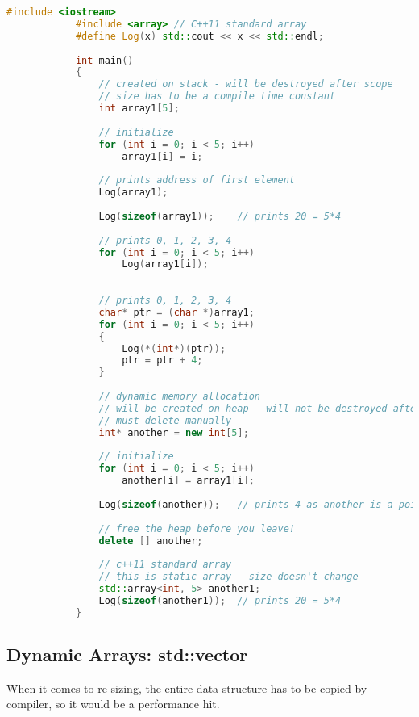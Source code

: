 \documentclass{article}
\begin{document}
        \begin{lstlisting}[language=C++, caption=Raw arrays - Stack vs Heap example]
            #include <iostream>
            #include <array> // C++11 standard array
            #define Log(x) std::cout << x << std::endl;
            
            int main()
            {
            	// created on stack - will be destroyed after scope
            	// size has to be a compile time constant
            	int array1[5];
            
            	// initialize
            	for (int i = 0; i < 5; i++)
            		array1[i] = i;
            
            	// prints address of first element
            	Log(array1);	
            
            	Log(sizeof(array1));	// prints 20 = 5*4
            
            	// prints 0, 1, 2, 3, 4
            	for (int i = 0; i < 5; i++)
            		Log(array1[i]); 
            
            	
            	// prints 0, 1, 2, 3, 4
            	char* ptr = (char *)array1;
            	for (int i = 0; i < 5; i++)
            	{
            		Log(*(int*)(ptr));
            		ptr = ptr + 4;
            	}
            
            	// dynamic memory allocation
            	// will be created on heap - will not be destroyed after scope
            	// must delete manually
            	int* another = new int[5];
            
            	// initialize
            	for (int i = 0; i < 5; i++)
            		another[i] = array1[i];
            
            	Log(sizeof(another));	// prints 4 as another is a pointer
            
            	// free the heap before you leave!
            	delete [] another;
            
            	// c++11 standard array
            	// this is static array - size doesn't change
            	std::array<int, 5> another1;
            	Log(sizeof(another1));	// prints 20 = 5*4
            } 
        \end{lstlisting}

    \subsection{Dynamic Arrays: std::vector}
        When it comes to re-sizing, the entire data structure has to be copied by compiler, so it would be a performance hit. 
        
\end{document}
